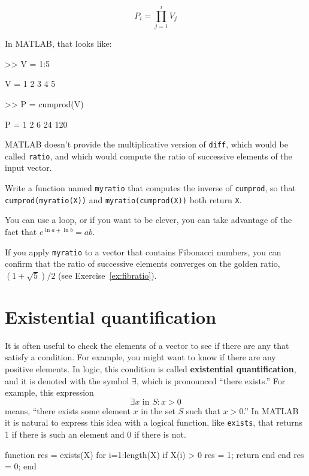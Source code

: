 \documentclass[
]{book}
\numberwithin{Answer}{chapter}
\numberwithin{Exercise}{chapter}
\begin{document}
\begin{equation}
P_i = \prod_{j=1}^i V_j
\end{equation}

In MATLAB, that looks like:

\begin{code}
>> V = 1:5

V = 1     2     3     4     5

>> P = cumprod(V)

P = 1     2     6    24   120
\end{code}

MATLAB doesn't provide the multiplicative version
of {\tt diff}, which would be called {\tt ratio}, and which would
compute the ratio of successive elements of the input vector.

\begin{ex}
Write a function named {\tt myratio} that computes the
inverse of {\tt cumprod}, so that {\tt cumprod(myratio(X))} and
{\tt myratio(cumprod(X))} both
return {\tt X}.

You can use a loop, or if you want to be clever, you can take
advantage of the fact that $e^{\ln a + \ln b} = a b$.

If you apply {\tt myratio} to a vector that contains Fibonacci
numbers, you can confirm that the ratio of successive elements
converges on the golden ratio, $(1+\sqrt{5})/2$ (see
Exercise~\ref{ex:fibratio}).

\end{ex}



\section{Existential quantification}

It is often useful to check the elements of a vector to see if there
are any that satisfy a condition.  For example, you might want to
know if there are any positive elements.  In logic, this condition
is called {\bf existential quantification}, and it is denoted with
the symbol $\exists$, which is pronounced ``there exists.''  For example,
this expression
%
\[ \exists x \mbox{~in~} S: x>0  \]
%
means, ``there exists some element $x$ in the set $S$ such that
$x>0$.''  In MATLAB it is natural to express this idea with a logical
function, like {\tt exists}, that returns 1 if there is such an
element and 0 if there is not.

\begin{code}
function res = exists(X)
    for i=1:length(X)
        if X(i) > 0
            res = 1;
            return
        end
    end
    res = 0;
end
\end{code}
\end{document}
